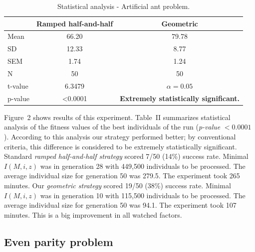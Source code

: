 \documentclass[conference]{IEEEtran}
\begin{document}
\begin{table}[t]
\centering
\begin{tabular}{|l|cc|}
\hline
& Ramped half-and-half & Geometric \\
\hline
Mean & 66.20 & 79.78 \\
SD	 & 12.33 & 8.77  \\
SEM	 & 1.74	 & 1.24  \\
N	 & 50    & 50    \\
\hline
t-value &  6.3479           & $\alpha = 0.05$\\
p-value &  \textless 0.0001 &  \textbf{Extremely statistically significant.}\\
\hline
\end{tabular}
\caption{Statistical analysis - Artificial ant problem.}
\end{table}


Figure~2 shows results of this experiment. 
Table~II summarizes statistical analysis
of the fitness values of the best individuals of the run 
(\textit{p-value} $ < 0.0001$).  
According to this analysis our strategy performed better;
by conventional criteria, this difference is considered to be extremely statistically significant.
Standard \textit{ramped half-and-half strategy} scored 7/50 (14\%) success rate. 
Minimal $I(M,i,z)$ was in generation 28 with 449,500 individuals to be processed.
The average individual size for generation 50 was 279.5.
The experiment took 265 minutes.
Our \textit{geometric strategy} scored 19/50 (38\%) success rate. 
Minimal $I(M,i,z)$ was in generation 10 with 115,500 individuals to be processed.
The average individual size for generation 50 was 94.1.
The experiment took 107 minutes.
This is a big improvement in all watched factors.

\subsection{Even parity problem}
\end{document}

